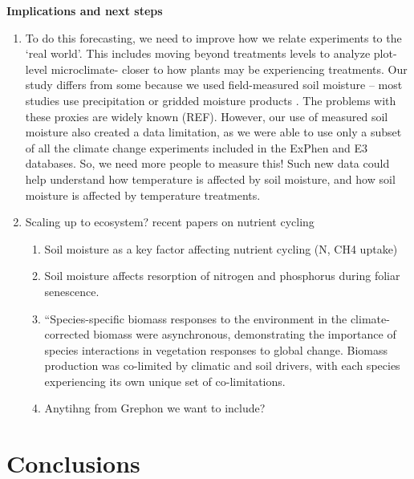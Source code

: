 \documentclass{article}
\begin{document}
\textbf {Implications and next steps}
\begin{enumerate}
\item To do this forecasting, we need to improve how we relate experiments to the `real world'. This includes moving beyond treatments levels to analyze plot-level microclimate- closer to how plants may be experiencing treatments. Our study differs from some because we used field-measured soil moisture -- most studies use precipitation \citep[e.g.,][]{tao2020} or gridded moisture products \citep[e.g.,][]{tao2019}. The problems with these proxies are widely known (REF). However, our use of measured soil moisture also created a data limitation, as we were able to use only a subset of all the climate change experiments included in the ExPhen and E3 databases. So, we need more people to measure this! Such new data could help understand how temperature is affected by soil moisture, and how soil moisture is affected by temperature treatments.
\item  Scaling up to ecosystem? recent papers on nutrient cycling
\begin{enumerate}
\item Soil moisture as a key factor affecting nutrient cycling (N, CH4 uptake)\citep{liu2019soil}
\item Soil moisture affects resorption of nitrogen and phosphorus during foliar senescence\citep{estiarte2022}.
\item ``Species-specific biomass responses to the environment in the climate-corrected biomass were asynchronous, demonstrating the importance of species interactions in vegetation responses to global change. Biomass production was co-limited by climatic and soil drivers, with each species experiencing its own unique set of co-limitations.\citep{wilfahrt2021}
\item Anytihng from Grephon we want to include?
\end{enumerate}

\end{enumerate}
\section* {Conclusions}
\end{document}
